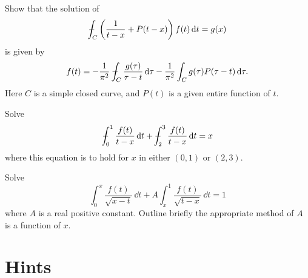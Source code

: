 \begin{Exercise}
  Show that the solution of 
  \[
  - \negthickspace \negthickspace \negthickspace \negmedspace\int_C \left( \frac{1}{t-x} + P(t-x) \right) f(t) \,\mathrm{d} t = g(x)
  \]
  is given by
  \[
  f(t) = - \frac{1}{\pi^2} - \negthickspace \negthickspace \negthickspace \negmedspace\int_C \frac{g(\tau)}{\tau-t} \,\mathrm{d} \tau
  - \frac{1}{\pi^2} \int_C g(\tau) P(\tau-t)\,\mathrm{d} \tau.
  \]
  Here $C$ is a simple closed curve, and $P(t)$ is a given entire function 
  of $t$.
\end{Exercise}



\begin{Exercise}
  Solve
  \[
  \pv\int_0^1 \frac{f(t)}{t-x} \,\dd t + \pv\int_2^3 \frac{f(t)}{t-x} \,\dd t = x
  \]
  where this equation is to hold for $x$ in either $(0,1)$ or $(2,3)$.
\end{Exercise}



\begin{Exercise}
  Solve
  \[
  \int_0^x \frac{f(t)}{\sqrt{x-t}} \,\dd t 
  + A \int_x^1 \frac{f(t)}{\sqrt{t-x}} \,\dd t = 1
  \]
  where $A$ is a real positive constant.  Outline briefly the appropriate
  method of $A$ is a function of $x$.
\end{Exercise}










\raggedbottom
\pagebreak
\flushbottom
\section{Hints}




\begin{Hint}
\end{Hint}



\begin{Hint}
\end{Hint}



